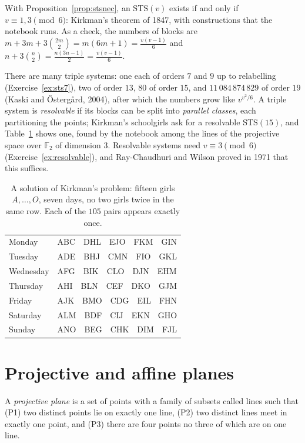 With Proposition~\ref{prop:stsnec}, an $\mathrm{STS}(v)$ exists if and only if $v\equiv1,3\pmod 6$: Kirkman's theorem of 1847, with constructions that the notebook runs. As
a check, the numbers of blocks are $m+3m+3\binom{2m}2=m(6m+1)=\frac{v(v-1)}6$ and $n+3\binom n2=\frac{n(3n-1)}2=\frac{v(v-1)}6$.

There are many triple systems: one each of orders $7$ and $9$ up to relabelling (Exercise~\ref{ex:sts7}), two of order $13$, $80$ of order $15$, and $11\,084\,874\,829$ of order
$19$ (Kaski and \"Osterg\aa rd, 2004), after which the numbers grow like $v^{v^2/6}$. A triple system is \emph{resolvable} if its blocks can be split into \emph{parallel classes},
each partitioning the points; Kirkman's schoolgirls ask for a resolvable $\mathrm{STS}(15)$, and Table~\ref{tab:kirkman} shows one, found by the notebook among the lines of the
projective space over $\mathbb F_2$ of dimension $3$. Resolvable systems need $v\equiv3\pmod 6$ (Exercise~\ref{ex:resolvable}), and Ray-Chaudhuri and Wilson proved in 1971 that this
suffices.

\begin{table}[ht]
\centering
\begin{tabular}{ll}
Monday & ABC\ \ DHL\ \ EJO\ \ FKM\ \ GIN\\
Tuesday & ADE\ \ BHJ\ \ CMN\ \ FIO\ \ GKL\\
Wednesday & AFG\ \ BIK\ \ CLO\ \ DJN\ \ EHM\\
Thursday & AHI\ \ BLN\ \ CEF\ \ DKO\ \ GJM\\
Friday & AJK\ \ BMO\ \ CDG\ \ EIL\ \ FHN\\
Saturday & ALM\ \ BDF\ \ CIJ\ \ EKN\ \ GHO\\
Sunday & ANO\ \ BEG\ \ CHK\ \ DIM\ \ FJL
\end{tabular}
\caption{A solution of Kirkman's problem: fifteen girls $A,\dots,O$, seven days, no two girls twice in the same row. Each of the $105$ pairs appears exactly once.}
\label{tab:kirkman}
\end{table}

\section{Projective and affine planes}\label{sec:planes}

\begin{definition}\label{def:pp}
A \emph{projective plane} is a set of points with a family of subsets called lines such that (P1) two distinct points lie on exactly one line, (P2) two distinct lines meet in exactly
one point, and (P3) there are four points no three of which are on one line.
\end{definition}

